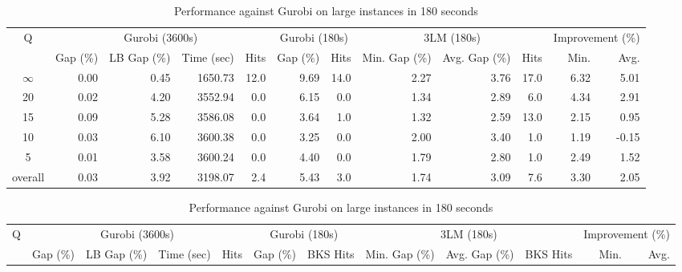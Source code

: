 \begin{table}[H]
\centering
\caption{Performance against Gurobi on large instances in 180 seconds}
\label{tab:3lm_resuts200T180}
\begin{tabular}{c rrrr rr rrr rr}
\toprule
       Q & \multicolumn{4}{c}{Gurobi (3600s)} & \multicolumn{2}{c}{Gurobi (180s)} & \multicolumn{3}{c}{3LM (180s)} & \multicolumn{2}{c}{Improvement (\%)} \\
         &       Gap (\%) & LB Gap (\%) & Time (sec) & Hits &      Gap (\%) & Hits & Min. Gap (\%) & Avg. Gap (\%) & Hits &             Min. &  Avg. \\
\cmidrule(lr){1-1} \cmidrule(lr){2-5} \cmidrule(lr){2-5} \cmidrule(lr){6-7} \cmidrule(lr){8-10} \cmidrule(lr){11-12}
$\infty$ &           0.00 &        0.45 &    1650.73 & 12.0 &          9.69 & 14.0 &          2.27 &          3.76 & 17.0 &             6.32 &  5.01 \\
      20 &           0.02 &        4.20 &    3552.94 &  0.0 &          6.15 &  0.0 &          1.34 &          2.89 &  6.0 &             4.34 &  2.91 \\
      15 &           0.09 &        5.28 &    3586.08 &  0.0 &          3.64 &  1.0 &          1.32 &          2.59 & 13.0 &             2.15 &  0.95 \\
      10 &           0.03 &        6.10 &    3600.38 &  0.0 &          3.25 &  0.0 &          2.00 &          3.40 &  1.0 &             1.19 & -0.15 \\
       5 &           0.01 &        3.58 &    3600.24 &  0.0 &          4.40 &  0.0 &          1.79 &          2.80 &  1.0 &             2.49 &  1.52 \\
\midrule
 overall &           0.03 &        3.92 &    3198.07 &  2.4 &          5.43 &  3.0 &          1.74 &          3.09 &  7.6 &             3.30 &  2.05 \\
\bottomrule
\end{tabular}
\end{table}\begin{table}[H]
\centering
\caption{Performance against Gurobi on large instances in 180 seconds}
\label{tab:3lm_resuts200T180}
\begin{tabular}{c rrrr rr rrr rr}
\toprule
       Q & \multicolumn{4}{c}{Gurobi (3600s)} & \multicolumn{2}{c}{Gurobi (180s)} & \multicolumn{3}{c}{3LM (180s)} & \multicolumn{2}{c}{Improvement (\%)} \\
         &       Gap (\%) & LB Gap (\%) & Time (sec) & Hits &      Gap (\%) & BKS Hits & Min. Gap (\%) & Avg. Gap (\%) & BKS Hits &             Min. &  Avg. \\

\end{tabular}
\end{table}
